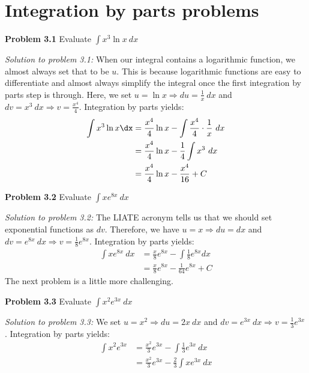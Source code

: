 \documentclass[11pt]{scrartcl}
\begin{document}
\section{Integration by parts problems}
\begin{tcolorbox}[colback=purple!5!white,colframe=purple!75!black]
\textbf{Problem 3.1} Evaluate $\int{x^3 \ln x \ dx}$
\end{tcolorbox}
\noindent
\textit{Solution to problem 3.1:} When our integral contains a logarithmic function, we almost always set that to be $u$. This is because logarithmic functions are easy to differentiate and almost always simplify the integral once the first integration by parts step is through. Here, we set $u= \ln x \Rightarrow du=\frac{1}{x} \ dx$ and $dv= x^3 \ dx \Rightarrow v=\frac{x^4}{4}$. Integration by parts yields:
\begin{align*}
    \int{x^3 \ln x \dx} &= \frac{x^4}{4}\ln x - \int{\frac{x^4}{4}\cdot \frac{1}{x} \ dx} \\
                        &= \frac{x^4}{4}\ln x -\frac{1}{4}\int{x^3 \ dx} \\
                        &= \frac{x^4}{4}\ln x -\frac{x^4}{16}+C
\end{align*}
\begin{tcolorbox}[colback=purple!5!white,colframe=purple!75!black]
\textbf{Problem 3.2} Evaluate $\int{x e^{8x} \ dx}$
\end{tcolorbox}
\noindent 
\textit{Solution to problem 3.2:} The LIATE acronym tells us that we should set exponential functions as $dv$. Therefore, we have $u=x \Rightarrow du=dx$ and $dv=e^{8x} \ dx \Rightarrow v=\frac{1}{8}{e^{8x}}$. Integration by parts yields:
\begin{align*}
    \int{xe^{8x} \ dx} &=\frac{x}{8}e^{8x}-\int{\frac{1}{8}e^{8x}dx} \\
    &=\frac{x}{8}e^{8x}-\frac{1}{64}e^{8x}+C
\end{align*}
\noindent 
The next problem is a little more challenging. 
\begin{tcolorbox}[colback=purple!5!white,colframe=purple!75!black]
\textbf{Problem 3.3} Evaluate $\int{x^2e^{3x} \ dx}$
\end{tcolorbox}
\noindent 
\textit{Solution to problem 3.3:} We set $u=x^2 \Rightarrow du=2x \ dx$ and $dv=e^{3x} \ dx \Rightarrow v=\frac{1}{3}e^{3x}$. Integration by parts yields:
\begin{align*}
    \int{x^2e^{3x}} &= \frac{x^2}{3}e^{3x}-\int{\frac{1}{3}e^{3x} \ dx} \\
                   &=\frac{x^2}{3}e^{3x}-\frac{2}{3}\int{xe^{3x} \ dx}
\end{align*}
\end{document}
